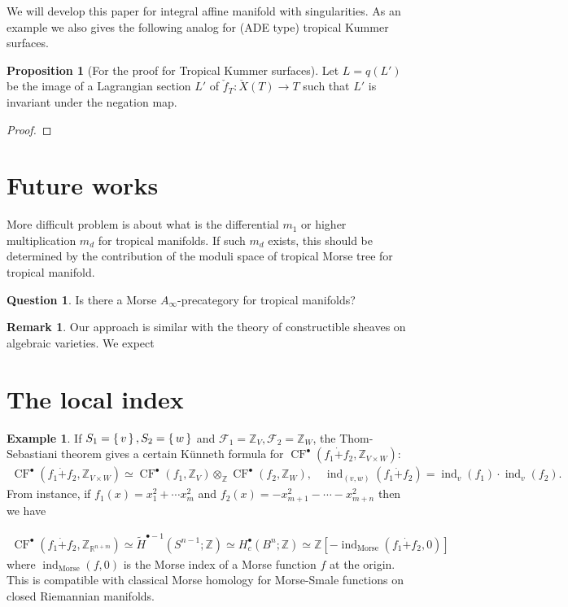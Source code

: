 \documentclass[a4paper,dvipdfmx,reqno,12pt]{amsart}
\theoremstyle{definition}
\newtheorem{Eg}[Thm]{Example}
\newtheorem{Prop}[Thm]{Proposition}
\newtheorem{Ques}[Thm]{Question}
\newtheorem{Rmk}[Thm]{Remark}
\newcommand{\R}{\mathbb{R}}%
\newcommand{\Z}{\mathbb{Z}}%
\newcommand{\mcal}[1]{\mathcal{#1}}%
\newcommand{\opn}[1]{\operatorname{#1}}
\numberwithin{equation}{section}
\begin{document}
We will develop this paper for integral affine manifold
with singularities. As an example we also gives the 
following analog for (ADE type) tropical Kummer surfaces.

\begin{Prop}[{For the proof for Tropical Kummer surfaces}]
Let $L=q(L')$ be the image of a Lagrangian 
section $L'$ of $\check{f}_{T}:\check{X}(T)\to T$ such 
that $L'$ is invariant under the negation map. 
\end{Prop}
\begin{proof}

\end{proof}


\section{Future works}
More difficult problem is about what is the differential $m_1$ or higher multiplication $m_d$ for tropical manifolds.
If such $m_d$ exists, this should be determined by the contribution of the moduli space of tropical Morse tree for tropical manifold.
\begin{Ques}
  Is there a Morse $A_{\infty}$-precategory for tropical manifolds?
\end{Ques}

\begin{Rmk}
Our approach is similar with the theory of constructible sheaves 
on algebraic varieties.
We expect
\end{Rmk}

\appendix

\section{The local index}

\begin{Eg}
  If $S_1=\set{v},S_2=\set{w}$ and $\mcal{F}_1=\Z_V, \mcal{F}_2=\Z_{W}$,
  the Thom-Sebastiani theorem gives
  a certain K\"unneth formula for
  $\opn{CF}^{\bullet}(f_1\dot{+}f_2,\Z_{V\times W})$:
  \begin{align}
    \opn{CF}^{\bullet}(f_1\dot{+}f_2,\Z_{V\times W})
    \simeq \opn{CF}^{\bullet}(f_1,\Z_{V})
    \otimes_{\Z} \opn{CF}^{\bullet}(f_2,\Z_{W}), \quad
    \opn{ind}_{(v,w)}(f_1\dot{+}f_2)=\opn{ind}_v(f_1)\cdot \opn{ind}_v(f_2).
  \end{align}
  From instance, if $f_1(x)=x_1^{2}+\cdots x_{m}^{2}$
  and $f_2(x)=-x_{m+1}^{2}-\cdots - x_{m+n}^{2}$ then we have

  \begin{align}
    \opn{CF}^{\bullet}(f_1\dot{+}f_2,\Z_{\R^{n+m}})
    \simeq \tilde{H}^{\bullet-1}(S^{n-1};\Z)
\simeq H^{\bullet}_c(B^{n};\Z)
    \simeq \Z[-\opn{ind}_{\mathrm{Morse}}(f_1\dot{+}f_2,0)]
  \end{align}
  where $\opn{ind}_{\mathrm{Morse}}(f,0)$ is the Morse index
  of a Morse function $f$ at the origin.
This is compatible with classical Morse homology for Morse-Smale functions
on closed Riemannian manifolds.
\end{Eg}
\end{document}
